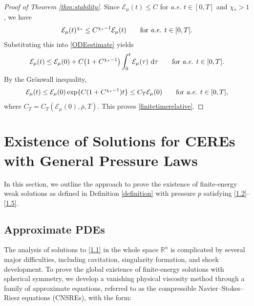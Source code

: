 \documentclass[reqno,11pt]{amsart}
\numberwithin{equation}{section}
\theoremstyle{definition}
\def\dd{{\, \rm d}}
\begin{document}
\begin{proof}[Proof of {\rm Theorem \ref{thm:stability}}]
Since $\mathcal E_\mu(t)\le C$ for {\it a.e.} $t\in[0,T]$ and $\chi_*>1$, we have
\[
 \mathcal E_\mu(t)^{\chi_*}
 \le C^{\chi_*-1}\mathcal E_\mu(t)
 \qquad\hbox{for {\it a.e.} }t\in[0,T].
\]
Substituting this into \eqref{ODEestimate} yields
\[
 \mathcal E_\mu(t)
 \le \mathcal E_\mu(0)
 +C\bigl(1+C^{\chi_*-1}\bigr)\int_0^t\mathcal E_\mu(\tau)\,\dd\tau\qquad 
\hbox{for {\it a.e.} }t\in[0,T].
\]
By the Grönwall inequality,
\[
 \mathcal E_\mu(t)
 \le \mathcal E_\mu(0)\exp\{C(1+C^{\chi_*-1})t\}
 \le C_T\mathcal E_\mu(0)
 \qquad \hbox{for {\it a.e.} }t\in[0,T],
\]
where $C_T=C_T(\mathcal E_\mu(0), \bar{\rho}, T)$.  This proves \eqref{finitetimerelative}.
\end{proof}

\medskip
\section{Existence of Solutions for CEREs with  General Pressure Laws}\label{existy}

In this section, we outline the approach to prove the existence of finite-energy weak solutions 
as defined in Definition \ref{definition} with pressure $p$ satisfying \eqref{1.2}--\eqref{1.5}.

\subsection{Approximate PDEs}
The analysis of solutions to \eqref{1.1} in the whole space $\mathbb{R}^n$ is complicated by several major difficulties, including cavitation, singularity formation, and shock development. 
To prove the global existence of finite-energy solutions with spherical symmetry, 
we develop a vanishing physical viscosity method through a family of approximate equations, 
referred to as the compressible Navier–Stokes–Riesz equations (CNSREs), with the form:
\end{document}
